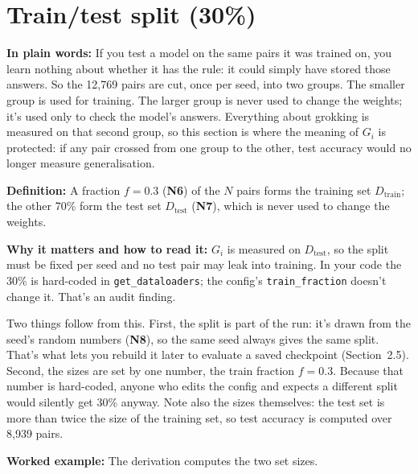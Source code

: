 \documentclass[11pt,a4paper,oneside,openany]{report}
\newcommand{\Dtrain}{D_{\mathrm{train}}}
\newcommand{\Dtest}{D_{\mathrm{test}}}
\newcommand{\code}[1]{\texttt{#1}}
\newcommand{\gl}[1]{\textbf{#1}}   %
\newcommand{\fplain}{\textbf{In plain words:} }
\newcommand{\fdef}{\textbf{Definition:} }
\newcommand{\fread}{\par\textbf{Why it matters and how to read it:} }
\newcommand{\fex}{\par\textbf{Worked example:} }
\begin{document}
\section{Train/test split (30\%)}
\fplain If you test a model on the same pairs it was trained on, you learn nothing about whether it has the rule: it could simply have stored those answers. So the 12{,}769 pairs are cut, once per seed, into two groups. The smaller group is used for training. The larger group is never used to change the weights; it's used only to check the model's answers. Everything about grokking is measured on that second group, so this section is where the meaning of $G_i$ is protected: if any pair crossed from one group to the other, test accuracy would no longer measure generalisation.

\fdef A fraction $f = 0.3$ (\gl{N6}) of the $N$ pairs forms the training set $\Dtrain$; the other 70\% form the test set $\Dtest$ (\gl{N7}), which is never used to change the weights.
\fread $G_i$ is measured on $\Dtest$, so the split must be fixed per seed and no test pair may leak into training. In your code the 30\% is hard-coded in \code{get\_\allowbreak{}dataloaders}; the config's \code{train\_\allowbreak{}fraction} doesn't change it. That's an audit finding.

Two things follow from this. First, the split is part of the run: it's drawn from the seed's random numbers (\gl{N8}), so the same seed always gives the same split. That's what lets you rebuild it later to evaluate a saved checkpoint (Section~2.5). Second, the sizes are set by one number, the train fraction $f = 0.3$. Because that number is hard-coded, anyone who edits the config and expects a different split would silently get 30\% anyway. Note also the sizes themselves: the test set is more than twice the size of the training set, so test accuracy is computed over 8{,}939 pairs.

\fex The derivation computes the two set sizes.
\end{document}
